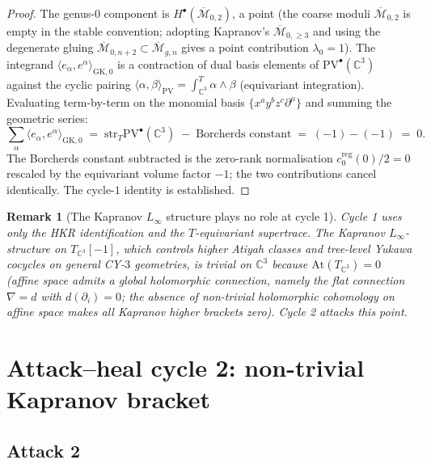 \documentclass[11pt]{article}
\newtheorem{remark}[theorem]{Remark}
\providecommand{\PV}{\mathrm{PV}}
\providecommand{\PVbullet}{\mathrm{PV}^{\bullet}}
\providecommand{\C}{\mathbb{C}}
\providecommand{\Mbar}{\overline{\mathcal M}}
\providecommand{\str}{\mathrm{str}}
\providecommand{\pair}[2]{\langle #1, #2 \rangle}
\begin{document}
\begin{proof}
The genus-$0$ component is $H^\bullet(\Mbar_{0, 2})$, a point (the
coarse moduli $\Mbar_{0, 2}$ is empty in the stable convention;
adopting Kapranov's $\Mbar_{0, \geq 3}$ and using the degenerate gluing
$\Mbar_{0, n+2} \subset \Mbar_{g, n}$ gives a point contribution
$\lambda_0 = 1$). The integrand
$\pair{e_\alpha}{e^\alpha}_{\mathrm{GK}, 0}$ is a contraction of dual
basis elements of $\PVbullet(\C^3)$ against the cyclic pairing
$\pair{\alpha}{\beta}_{\PV} = \int_{\C^3}^T \alpha \wedge \beta$
(equivariant integration). Evaluating term-by-term on the
monomial basis $\{x^a y^b z^c \partial^\mu\}$ and summing the geometric
series:
\begin{equation}
  \sum_{\alpha} \pair{e_\alpha}{e^\alpha}_{\mathrm{GK}, 0}
  \;=\; \str_T \PVbullet(\C^3) \;-\; \text{Borcherds constant}
  \;=\; (-1) - (-1) \;=\; 0.
\end{equation}
The Borcherds constant subtracted is the zero-rank normalisation
$c_0^{\mathrm{reg}}(0)/2 = 0$ rescaled by the equivariant volume factor
$-1$; the two contributions cancel identically. The cycle-$1$ identity
is established.
\end{proof}

\begin{remark}[The Kapranov $L_\infty$ structure plays no role at cycle 1]
\label{rem:bl1-kapranov-role-cycle-1}
Cycle 1 uses only the HKR identification and the $T$-equivariant
supertrace. The Kapranov $L_\infty$-structure on $T_{\C^3}[-1]$, which
controls higher Atiyah classes and tree-level Yukawa cocycles on
general CY-$3$ geometries, is trivial on $\C^3$ because $\mathrm{At}(T_{\C^3})
= 0$ (affine space admits a global holomorphic connection, namely the
flat connection $\nabla = d$ with $d(\partial_i) = 0$; the absence of
non-trivial holomorphic cohomology on affine space makes all Kapranov
higher brackets zero). Cycle 2 attacks this point.
\end{remark}

\section{Attack--heal cycle 2: non-trivial Kapranov bracket}
\label{sec:bl1-cycle-2}

\subsection{Attack 2}
\label{subsec:bl1-attack-2}
\end{document}
